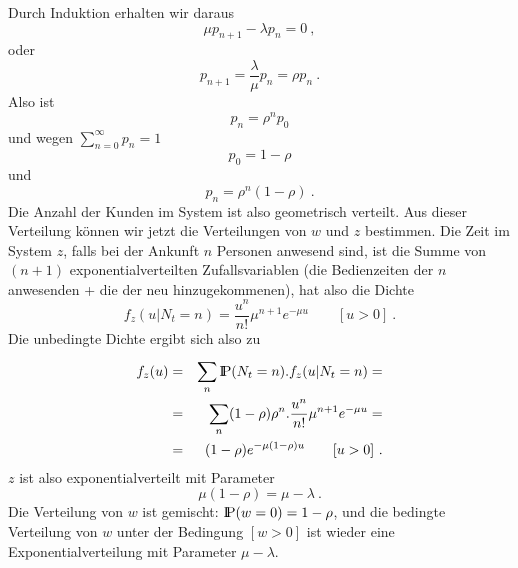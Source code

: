 Durch Induktion erhalten wir daraus
\begin{displaymath}
\mu p_{n+1} - \lambda p_{n} = 0 ~,
\end{displaymath}
oder
\begin{displaymath}
p_{n+1} = \frac{\lambda}{\mu} p_{n} = \rho p_{n} ~.
\end{displaymath}
Also ist
\begin{displaymath}
p_{n} = \rho^{n}p_{0}
\end{displaymath}
und wegen $\sum_{n=0}^{\infty} p_{n} = 1$
\begin{displaymath}
p_{0} = 1- \rho
\end{displaymath}
und
\begin{displaymath}
p_{n} = \rho^{n} (1- \rho) ~.
\end{displaymath}
Die Anzahl der Kunden im System ist also geometrisch verteilt. Aus dieser
Verteilung können wir jetzt die Verteilungen von $w$ und $z$ bestimmen.
Die Zeit im System $z$, falls bei der Ankunft $n$ Personen anwesend sind,
ist die Summe von $(n+1)$ exponentialverteilten Zufallsvariablen (die
Bedienzeiten der $n$ anwesenden + die der neu hinzugekommenen), hat also
die Dichte
\begin{displaymath}
f_{z}(u|N_{t}=n) = \frac{u^{n}}{n!} \mu^{n+1} e^{- \mu u} \qquad [u>0] ~.
\end{displaymath}
Die unbedingte Dichte ergibt sich also zu
\begin{eqnarray*}
f_{z}(u) &=& \sum_{n}^{} {\rm I\kern-0.2em P}(N_{t}=n).f_{z}(u|N_{t}=n) = \\
 &=& \sum_{n}^{} (1- \rho) \rho^{n}. \frac{u^{n}}{n!} \mu^{n+1} e^{- \mu
u} = \\
 &=& (1- \rho) e^{- \mu(1- \rho)u} \qquad [u>0] ~.
\end{eqnarray*}
$z$ ist also exponentialverteilt mit Parameter
\begin{displaymath}
\mu (1- \rho) = \mu - \lambda ~.
\end{displaymath}
Die Verteilung von $w$ ist gemischt: ${\rm I\kern-0.2em P} (w=0) = 1- \rho$, und die
bedingte Verteilung von $w$ unter der Bedingung $[w>0]$ ist wieder eine
Exponentialverteilung mit Parameter $\mu - \lambda$.
